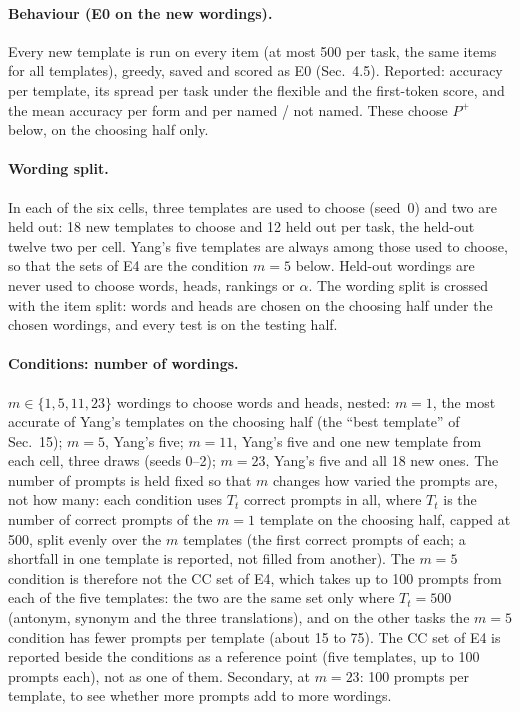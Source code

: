 \paragraph{Behaviour (E0 on the new wordings).} Every new template is run on every item (at
most 500 per task, the same items for all templates), greedy, saved and scored as E0
(Sec.~4.5). Reported: accuracy per template, its spread per task under the flexible and the
first-token score, and the mean accuracy per form and per named / not named. These choose
$P^+$ below, on the choosing half only.

\paragraph{Wording split.} In each of the six cells, three templates are used to choose
(seed~0) and two are held out: 18 new templates to choose and 12 held out per task, the held-out
twelve two per cell. Yang's five templates are always among those used to choose, so that the
sets of E4 are the condition $m = 5$ below. Held-out wordings are never used to choose words,
heads, rankings or $\alpha$. The wording split is crossed with the item split: words and heads
are chosen on the choosing half under the chosen wordings, and every test is on the testing
half.

\paragraph{Conditions: number of wordings.} $m \in \{1, 5, 11, 23\}$ wordings to choose words
and heads, nested: $m = 1$, the most accurate of Yang's templates on the choosing half (the
``best template'' of Sec.~15); $m = 5$, Yang's five; $m = 11$, Yang's five and one new template
from each cell, three draws (seeds 0--2); $m = 23$, Yang's five and all 18 new ones. The number
of prompts is held fixed so that $m$ changes how varied the prompts are, not how many: each
condition uses $T_t$ correct prompts in all, where $T_t$ is the number of correct prompts of the
$m = 1$ template on the choosing half, capped at 500, split evenly over the $m$ templates (the
first correct prompts of each; a shortfall in one template is reported, not filled from
another). The $m = 5$ condition is therefore not the CC set of E4, which takes up to 100
prompts from each of the five templates: the two are the same set only where $T_t = 500$
(antonym, synonym and the three translations), and on the other tasks the $m = 5$ condition
has fewer prompts per template (about 15 to 75). The CC set of E4 is reported beside the
conditions as a reference point (five templates, up to 100 prompts each), not as one of them.
Secondary, at $m = 23$: 100 prompts per template, to see
whether more prompts add to more wordings.

